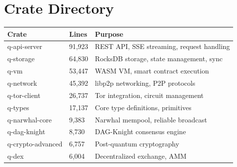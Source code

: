\documentclass[12pt,a4paper]{article}
\begin{document}
\appendix

\section{Crate Directory}

\begin{longtable}{@{}llp{7cm}@{}}
\toprule
\textbf{Crate} & \textbf{Lines} & \textbf{Purpose} \\
\midrule
\endhead
q-api-server & 91,923 & REST API, SSE streaming, request handling \\
q-storage & 64,830 & RocksDB storage, state management, sync \\
q-vm & 53,447 & WASM VM, smart contract execution \\
q-network & 45,392 & libp2p networking, P2P protocols \\
q-tor-client & 26,737 & Tor integration, circuit management \\
q-types & 17,137 & Core type definitions, primitives \\
q-narwhal-core & 9,383 & Narwhal mempool, reliable broadcast \\
q-dag-knight & 8,730 & DAG-Knight consensus engine \\
q-crypto-advanced & 6,757 & Post-quantum cryptography \\
q-dex & 6,004 & Decentralized exchange, AMM \\
\bottomrule
\end{longtable}
\end{document}

